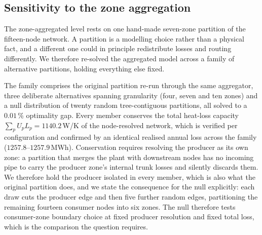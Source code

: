
\subsection{Sensitivity to the zone aggregation}
\label{subsec:clustering}

The zone-aggregated level rests on one hand-made seven-zone partition of the fifteen-node
network. A partition is a modelling choice rather than a physical fact, and a different one
could in principle redistribute losses and routing differently. We therefore re-solved the
aggregated model across a family of alternative partitions, holding everything else fixed.

The family comprises the original partition re-run through the same aggregator, three
deliberate alternatives spanning granularity (four, seven and ten zones) and a null
distribution of twenty random tree-contiguous partitions, all solved to a $0.01$\,\%
optimality gap. Every member conserves the total heat-loss capacity
$\sum_p U_p L_p = 1140.2$\,W/K of the node-resolved network, which is verified per
configuration and confirmed by an identical realised annual loss across the family
($1257.8$--$1257.9$\,MWh). Conservation requires resolving the producer as its own zone: a
partition that merges the plant with downstream nodes has no incoming pipe to carry the
producer zone's internal trunk losses and silently discards them. We therefore hold the
producer isolated in every member, which is also what the original partition does, and we
state the consequence for the null explicitly: each draw cuts the producer edge and then
five further random edges, partitioning the remaining fourteen consumer nodes into six
zones. The null therefore tests consumer-zone boundary choice at fixed producer resolution
and fixed total loss, which is the comparison the question requires.

